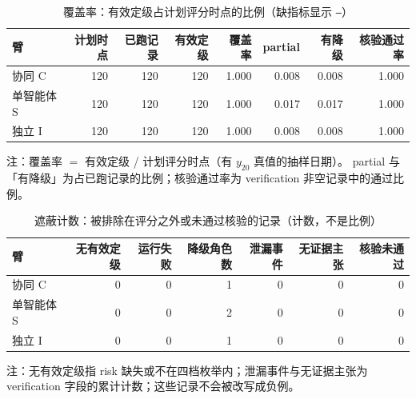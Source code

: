\begin{table}[t]
\centering
\caption{覆盖率：有效定级占计划评分时点的比例（缺指标显示 \texttt{--}）}
\label{tab:coverage}
\footnotesize
\setlength{\tabcolsep}{3pt}
\begin{tabular}{lrrrrrrr}
\toprule
臂 & 计划时点 & 已跑记录 & 有效定级 & 覆盖率 & partial & 有降级 & 核验通过率 \\
\midrule
协同 C & 120 & 120 & 120 & 1.000 & 0.008 & 0.008 & 1.000 \\
单智能体 S & 120 & 120 & 120 & 1.000 & 0.017 & 0.017 & 1.000 \\
独立 I & 120 & 120 & 120 & 1.000 & 0.008 & 0.008 & 1.000 \\
\bottomrule
\end{tabular}
\par\smallskip
\raggedright\scriptsize
注：覆盖率 $=$ 有效定级 / 计划评分时点（有 $y_{20}$ 真值的抽样日期）。
partial 与「有降级」为占已跑记录的比例；核验通过率为 verification 非空记录中的通过比例。
\end{table}

\begin{table}[t]
\centering
\caption{遮蔽计数：被排除在评分之外或未通过核验的记录（计数，不是比例）}
\label{tab:masking}
\footnotesize
\setlength{\tabcolsep}{3pt}
\begin{tabular}{lrrrrrr}
\toprule
臂 & 无有效定级 & 运行失败 & 降级角色数 & 泄漏事件 & 无证据主张 & 核验未通过 \\
\midrule
协同 C & 0 & 0 & 1 & 0 & 0 & 0 \\
单智能体 S & 0 & 0 & 2 & 0 & 0 & 0 \\
独立 I & 0 & 0 & 1 & 0 & 0 & 0 \\
\bottomrule
\end{tabular}
\par\smallskip
\raggedright\scriptsize
注：无有效定级指 risk 缺失或不在四档枚举内；泄漏事件与无证据主张为
verification 字段的累计计数；这些记录不会被改写成负例。
\end{table}
